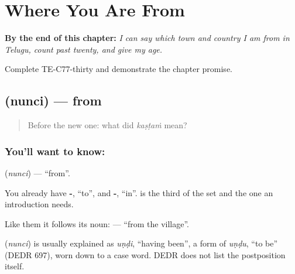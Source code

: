 
\chapter{Where You Are From}
\label{ch:te-where-you-are-from}

\begin{chapteropening}
\textbf{By the end of this chapter:} \emph{I can say which town and country I am from in Telugu, count past twenty, and give my age.}

Complete TE-C77-thirty and demonstrate the chapter promise.
\end{chapteropening}

\section[\texorpdfstring{\te{నుంచి} (nunci)}{నుంచి (nunci)}]{ (nunci) — from}

\label{lesson:TE-C77-from}



\begin{quote}
Before the new one: what did \emph{kaṣṭaṁ} mean?
\end{quote}

\subsection*{You'll want to know: }
\textbf{} (\emph{nunci}) — \textquotedblleft{}from\textquotedblright{}.

You already have \textbf{-}, \textquotedblleft{}to\textquotedblright{}, and \textbf{-}, \textquotedblleft{}in\textquotedblright{}.  is the third of the set and the one an introduction needs.

Like them it follows its noun: \textbf{ } — \textquotedblleft{}from the village\textquotedblright{}.

\begin{cousinweb}
\textbf{} (\emph{nunci}) is usually explained as \emph{uṇḍi}, \textquotedblleft{}having been\textquotedblright{}, a form of \emph{uṇḍu}, \textquotedblleft{}to be\textquotedblright{} (DEDR 697), worn down to a case word. DEDR does not list the postposition itself.
\end{cousinweb}


